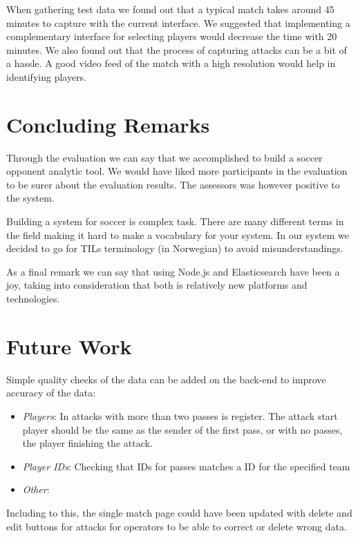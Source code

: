 When gathering test data we found out that a typical match takes around 45 minutes to capture with the current interface. We suggested that implementing a complementary interface for selecting players would decrease the time with 20 minutes. We also found out that the process of capturing attacks can be a bit of a hassle. A good video feed of the match with a high resolution would help in identifying players.

\section{Concluding Remarks}

Through the evaluation we can say that we accomplished to build a soccer opponent analytic tool. We would have liked more participants in the evaluation to be surer about the evaluation results. The assessors was however positive to the system.

Building a system for soccer is complex task. There are many different terms in the field making it hard to make a vocabulary for your system. In our system we decided to go for \ac{TIL}s terminology (in Norwegian) to avoid misunderstandings. 

As a final remark we can say that using Node.js and Elasticsearch have been a joy, taking into consideration that both is relatively new platforms and technologies. 

\section{Future Work}

Simple quality checks of the data can be added on the back-end to improve accuracy of the data:

\begin{itemize}
\item \emph{Players}: In attacks with more than two passes is register. The attack start player should be the same as the sender of the first pass, or with no passes, the player finishing the attack. 
\item \emph{Player IDs}: Checking that IDs for passes matches a ID for the specified team
\item \emph{Other}: 
\end{itemize}

Including to this, the single match page could have been updated with delete and edit buttons for attacks for operators to be able to correct or delete wrong data.

